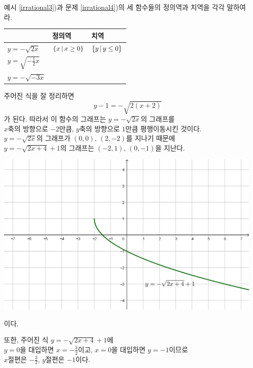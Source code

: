 \documentclass{oblivoir}
\begin{document}
%
\prob{}\label{irrational5}
예시 \ref{irrational3})과 문제 \ref{irrational4})의 세 함수들의 정의역과 치역을 각각 말하여라.
\begin{center}
\begin{tabu}to.7\textwidth[tabulinesep=10pt]{X|X[c]|X[c]}
					&정의역			&치역\\\hline
\(y=-\sqrt{2x}\)			&\(\{x\,|\, x\ge0\}\)	&\(\{y\,|\, y\le0\}\)\\
\(y=\sqrt{-\frac12x}\)	&\\
\(y=-\sqrt{-3x}\)		&
\end{tabu}
\end{center}

\newpage
%
\begin{mdframed}\label{irrational6}
주어진 식을 잘 정리하면
\[y-1=-\sqrt{2(x+2)}\]
가 된다.
따라서 이 함수의 그래프는 \(y=-\sqrt{2x}\)의 그래프를\\
\(x\)축의 방향으로 \(-2\)만큼, \(y\)축의 방향으로 \(1\)만큼 평행이동시킨 것이다.\\
\(y=-\sqrt{2x}\)의 그래프가 \((0,0)\), \((2,-2)\)를 지나기 때문에\\
\(y=-\sqrt{2x+4}+1\)의 그래프는 \((-2,1)\), \((0,-1)\)을 지난다.
\begin{center}
\includegraphics[width=0.99\textwidth]{irrational_6}
\end{center}
이다.

\bigskip
또한, 주어진 식 \(y=-\sqrt{2x+4}+1\)에\\[10pt]
\(y=0\)을 대입하면 \(x=-\frac32\)이고, \(x=0\)을 대입하면 \(y=-1\)이므로\\[10pt]
\(x\)절편은 \(-\frac32\), \(y\)절편은 \(-1\)이다.
\end{mdframed}
\end{document}
